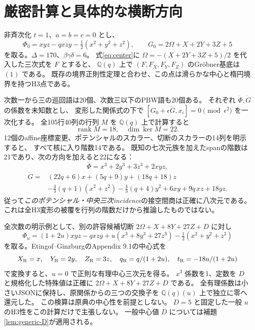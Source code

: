 \section{厳密計算と具体的な横断方向}\label{sec:exact}
非斉次化 $t=1$、$a=b=c=0$ とし、
\[
\Phi_0=xyz-qxzy-\tfrac12(x^2+y^2+z^2),\qquad
G_0=2\Omega+X+2Y+3Z+5
\]
を取る。$\Delta=170$、$\beta\gamma\delta=6$。
式\eqref{eq:center}に $\Omega=-(X+2Y+3Z+5)/2$ を代入した三次式を $F$ とすると、
$\mathbb Q(q)$ 上で $(F,F_X,F_Y,F_Z)$ のGr\"obner基底は $(1)$ である。
既存の境界正則性定理と合わせ、この点は滑らかな中心と楕円境界を持つH3点である。

次数一から三の巡回語は20個、次数三以下のPBW語も20個ある。
それぞれ $\dot\Phi,\dot G$ の係数を未知数とし、
変形した関係式の下で $[G_0+\epsilon\dot G,x_i]=0\pmod{\epsilon^2}$ を一次化する。
全105行40列の行列 $M$ を $\mathbb Q(q)$ 上で計算すると
\[
\operatorname{rank}M=18,\quad\dim\ker M=22.
\]
12個のaffine座標変更、ポテンシャルのスカラー、切断のスカラーの14列を明示すると、
すべて核に入り階数14である。
既知の七次元族を加えたspanの階数は21であり、次の方向を加えると22になる：
\[
\dot\Phi=x^3+2y^3+3z^3+2xyz,
\]
\begin{align*}
\dot G={}&(22q+6)x+(5q+9)y+(18q+18)z\\
&-\tfrac43(q+1)(x^2+z^2)-\tfrac43(q+4)y^2+6xy+9q\,xz+18yz.
\end{align*}
従って\emph{このポテンシャル・中央三次incidence}の接空間商は正確に八次元である。
これは全H3変形の被覆を行列の階数だけから推論したものではない。

全次数の明示例として、別の許容候補切断
$2\Omega+X+8Y+27Z+D$ に対し
\begin{equation}\label{eq:explicit-integral}
\Phi_u=(1+2u)xyz-qxzy+u(x^3+8y^3+27z^3)-\tfrac12(x^2+y^2+z^2)
\end{equation}
を取る。Etingof--GinzburgのAppendix 9.1の中心式を
\[
X_{\rm R}=x,\quad Y_{\rm R}=2y,\quad Z_{\rm R}=3z,
\quad q_{\rm R}=q/(1+2u),\quad t_{\rm R}=-18u/(1+2u)
\]
で変換すると、$u=0$ で正則な有理中心三次元を得る。
$x^3$ 係数を1、定数を $D$ と規格化した特殊値は正確に
$2\Omega+X+8Y+27Z+D$ である。
全有理係数は小さいJSONに保持し、原関係からの三つの交換子を
$\mathbb Q(q)(u)$ 上で独立に零へ還元した。
この検算は原典の中心性を前提としない。
$D=5$ と固定した一般 $u$ のH3性をこの計算だけで主張しない。
一般中心値 $D$ については補題\ref{lem:generic-D}が適用される。
